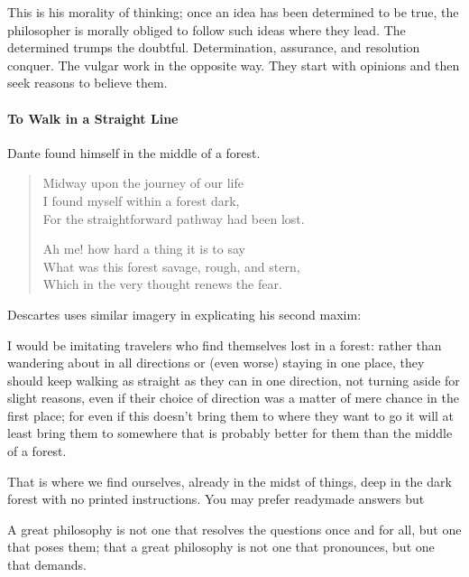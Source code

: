 This is his morality of thinking; once an idea has been determined to be true, the philosopher is morally obliged to follow such ideas where they lead. The determined trumps the doubtful. Determination, assurance, and resolution conquer. The vulgar work in the opposite way. They start with opinions and then seek reasons to believe them.

\paragraph{To Walk in a Straight Line}


Dante found himself in the middle of a forest.

\begin{quotex}
\begin{verse}
Midway upon the journey of our life\\ I found myself within a forest dark,\\ For the straightforward pathway had been lost.

Ah me! how hard a thing it is to say\\ What was this forest savage, rough, and stern,\\ Which in the very thought renews the fear.
\end{verse}
\end{quotex}


Descartes uses similar imagery in explicating his second maxim:

\begin{quotex}
I would be imitating travelers who find themselves lost in a forest: rather than wandering about in all directions or (even worse) staying in one place, they should keep walking as straight as they can in one direction, not turning aside for slight reasons, even if their choice of direction was a matter of mere chance in the first place; for even if this doesn't bring them to where they want to go it will at least bring them to somewhere that is probably better for them than the middle of a forest.
\end{quotex}


That is where we find ourselves, already in the midst of things, deep in the dark forest with no printed instructions. You may prefer readymade answers but

\begin{quotex}
A great philosophy is not one that resolves the questions once and for all, but one that poses them; that a great philosophy is not one that pronounces, but one that demands.
\end{quotex}


